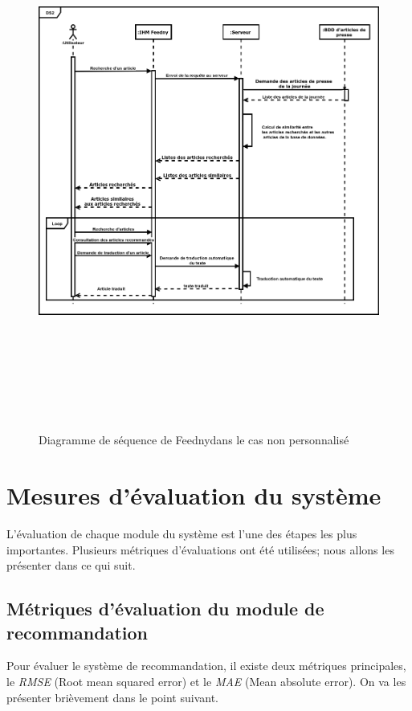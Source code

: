 \begin{figure}[H]
    \centering
    \includegraphics[height=500pt,width=425pt]{img/chapter3/diagseqnonperso.png}
    \caption{Diagramme de séquence de \textquotedbl Feedny\textquotedbl dans le cas non personnalisé}
\end{figure}

\section{Mesures d'évaluation du système}
L'évaluation de chaque module du système est l'une des étapes les plus importantes. Plusieurs métriques d'évaluations ont été utilisées; nous allons les présenter dans ce qui suit.

    \subsection{Métriques d'évaluation du module de recommandation}
    Pour évaluer le système de recommandation, il existe deux métriques principales, le \emph{RMSE} (Root mean squared error) et le \emph{MAE} (Mean absolute error). On va les présenter brièvement dans le point suivant. 

